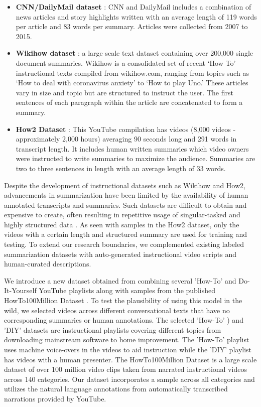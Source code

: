 \documentclass[sigconf]{acmart}
\begin{document}
\begin{itemize}

\item \textbf{CNN/DailyMail dataset} \cite{NIPS2015_5945}: CNN and DailyMail includes a combination of news articles and story highlights written with an average length of 119 words per article and 83 words per summary. Articles were collected from 2007 to 2015. 

\item \textbf{Wikihow dataset} \cite{DBLP:journals/corr/abs-1810-09305}: a large scale text dataset containing over 200,000 single document summaries. Wikihow is a consolidated set of recent ‘How To’ instructional texts compiled from wikihow.com, ranging from topics such as ‘How to deal with coronavirus anxiety’ to ‘How to play Uno.’ These articles vary in size and topic but are structured to instruct the user. The first sentences of each paragraph within the article are concatenated to form a summary. 

\item \textbf{How2 Dataset} \cite{DBLP:journals/corr/abs-1811-00347}:  This YouTube compilation has videos (8,000 videos - approximately 2,000 hours) averaging 90 seconds long and 291 words in transcript length. It includes human written summaries which video owners were instructed to write summaries to maximize the audience. Summaries are two to three sentences in length with an average length of 33 words. 

\end{itemize}

Despite the development of instructional datasets such as Wikihow and How2, advancements in summarization have been limited by the availability of human annotated transcripts and summaries. Such datasets are difficult to obtain and expensive to create, often resulting in repetitive usage of singular-tasked and highly structured data . As seen with samples in the How2 dataset, only the videos with a certain length and structured summary are used for training and testing. To extend our research boundaries, we complemented existing labeled summarization datasets with auto-generated instructional video scripts and human-curated descriptions. 

We introduce a new dataset obtained from combining several 'How-To' and Do-It-Yourself YouTube playlists along with samples from the published HowTo100Million Dataset \cite{DBLP:journals/corr/abs-1906-03327}. To test the plausibility of using this model in the wild, we selected videos across different conversational texts that have no corresponding summaries or human annotations. The selected 'How-To' \cite{How-toVideos}) and 'DIY'\cite{DIYHow-toVideos} datasets are instructional playlists covering different topics from downloading mainstream software to home improvement. The 'How-To' playlist uses machine voice-overs in the videos to aid instruction while the 'DIY' playlist has videos with a human presenter. The HowTo100Million Dataset is a large scale dataset of over 100 million video clips taken from narrated instructional videos across 140 categories. Our dataset incorporates a sample across all categories and utilizes the natural language annotations from automatically transcribed narrations provided by YouTube.
\end{document}
